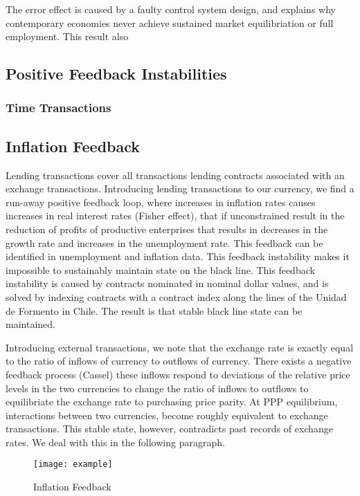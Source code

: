 The error effect is caused by a faulty control system design, and explains why contemporary
economies never achieve sustained market equilibriation or full employment. This result also

\subsection{Positive Feedback Instabilities}

\subsubsection{Time Transactions}

\subsection{Inflation Feedback}

Lending transactions cover all transactions lending contracts associated with an exchange
transactions. Introducing lending transactions to our currency, we find a run-away positive feedback
loop, where increases in inflation rates causes increases in real interest rates (Fisher effect),
that if unconstrained result in the reduction of profits of productive enterprises that results in
decreases in the growth rate and increases in the unemployment rate. This feedback can be identified
in unemployment and inflation data. This feedback instability makes it impossible to sustainably
maintain state on the black line. This feedback instability is caused by contracts nominated in
nominal dollar values, and is solved by indexing contracts with a contract index along the lines of
the Unidad de Formento in Chile. The result is that stable black line state can be maintained.

Introducing external transactions, we note that the exchange rate is exactly equal to the ratio of
inflows of currency to outflows of currency. There exists a negative feedback process (Cassel) these
inflows respond to deviations of the relative price levels in the two currencies to change the ratio
of inflows to outflows to equilibriate the exchange rate to purchasing price parity. At PPP
equilibrium, interactions between two currencies, become roughly equivalent to exchange
transactions. This stable state, however, contradicts past records of exchange rates. We deal with
this in the following paragraph.

\begin{figure}
\centering
\texttt{[image: example]}
\caption{Inflation Feedback}
\label{fig:inflation_feedback}
\end{figure}

